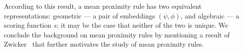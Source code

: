 \documentclass[prodmode]{acmsmall-ec14}
\newcommand{\calL}{{\mathcal{L}}}
\newcommand{\rank}{{\calL(A)}}
\newcommand{\calO}{{\mathcal{O}}}
\begin{document}
%

\noindent
According to this result, a mean proximity rule has two equivalent representations: geometric --- a pair of embeddings $(\psi,\phi)$, and algebraic --- a scoring function $s$; it may be the case that neither of the two is unique. We conclude the background on mean proximity rules by mentioning a result of Zwicker~ that further motivates the study of mean proximity rules.
\end{document}
